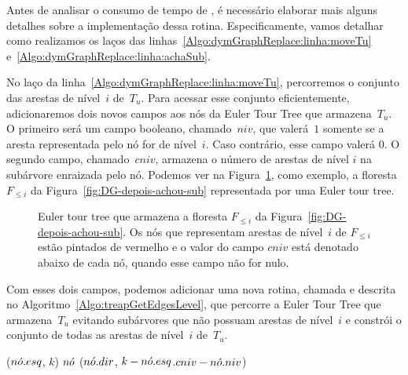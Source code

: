 Antes de analisar o consumo de tempo de \dymGraphReplace{}, é necessário elaborar mais alguns detalhes sobre a implementação dessa rotina. Especificamente, vamos detalhar como realizamos os laços das linhas~\ref{Algo:dymGraphReplace:linha:moveTu} e~\ref{Algo:dymGraphReplace:linha:achaSub}.

No laço da linha~\ref{Algo:dymGraphReplace:linha:moveTu}, percorremos o conjunto das arestas de nível~$i$ de~$T_u$. Para acessar esse conjunto eficientemente, adicionaremos dois novos campos aos nós da Euler Tour Tree que armazena~$T_u$. O primeiro será um campo booleano, chamado~$niv$, que valerá~$1$ somente se a aresta representada pelo nó for de nível~$i$. Caso contrário, esse campo valerá $0$. O segundo campo, chamado~$cniv$, armazena o número de arestas de nível $i$ na subárvore enraizada pelo nó. Podemos ver na Figura~\ref{fig:DG-TREAP-niv}, como exemplo, a floresta $F_{\leqslant i}$ da Figura~\ref{fig:DG-depois-achou-sub} representada por uma Euler tour tree.

\begin{figure}[htb]
\scalebox{.61}{
\centering
}
\caption{Euler tour tree que armazena a floresta $F_{\leqslant i}$ da Figura~\ref{fig:DG-depois-achou-sub}. Os nós que representam arestas de nível~$i$ de $F_{\leqslant i}$ estão pintados de vermelho e o valor do campo $cniv$ está denotado abaixo de cada nó, quando esse campo não for nulo.}
\label{fig:DG-TREAP-niv}
\end{figure}

Com esses dois campos, podemos adicionar uma nova rotina, chamada \treapGetEdgesLevel{} e descrita no Algoritmo~\ref{Algo:treapGetEdgesLevel}, que percorre a Euler Tour Tree que armazena~$T_u$ evitando subárvores que não possuam arestas de nível~$i$ e constrói o conjunto de todas as arestas de nível~$i$ de~$T_u$.

\begin{algorithm}
\caption{\treapGetEdgesLevel($\node$, $k$)}
\label{Algo:treapGetEdgesLevel}
\begin{algorithmic}[1]
\State \Return \Nil
\EndIf
{}
\State  \Return \treapGetEdgesLevel($n\acute{o}.esq$, $k$)
\EndIf
{}
\State  \Return $\node$
\EndIf
\State \Return \treapGetEdgesLevel($n\acute{o}.dir$, $k-n\acute{o}.esq$.$cniv-n\acute{o}.niv$)

\end{algorithmic}
\end{algorithm}

